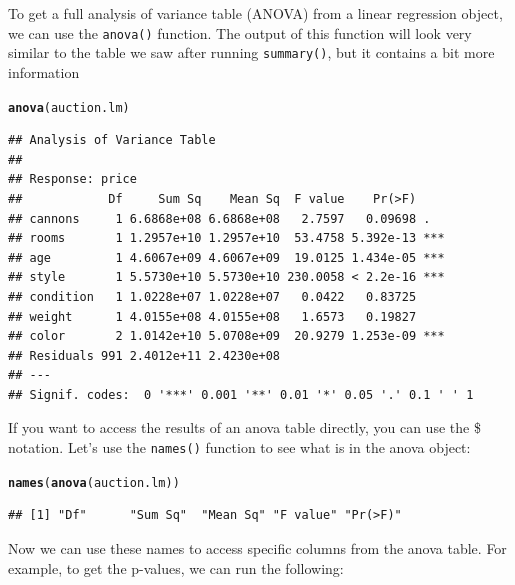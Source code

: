 \documentclass{tufte-book}\usepackage[]{graphicx}\usepackage[]{color}
\makeatletter
\newcommand{\hlstd}[1]{\textcolor[rgb]{0.345,0.345,0.345}{#1}}%
\newcommand{\hlkwd}[1]{\textcolor[rgb]{0.737,0.353,0.396}{\textbf{#1}}}%
\newenvironment{kframe}{%
 \def\at@end@of@kframe{}%
 \ifinner\ifhmode%
  \def\at@end@of@kframe{\end{minipage}}%
  \begin{minipage}{\columnwidth}%
 \fi\fi%
 \def\FrameCommand##1{\hskip\@totalleftmargin \hskip-\fboxsep
 \colorbox{shadecolor}{##1}\hskip-\fboxsep
     \hskip-\linewidth \hskip-\@totalleftmargin \hskip\columnwidth}%
 \MakeFramed {\advance\hsize-\width
   \@totalleftmargin\z@ \linewidth\hsize
   \@setminipage}}%
 {\par\unskip\endMakeFramed%
 \at@end@of@kframe}
\newenvironment{knitrout}{}{} %
\makeatother
\begin{document}
To get a full analysis of variance table (ANOVA) from a linear regression object, we can use the \texttt{anova()} function. The output of this function will look very similar to the table we saw after running \texttt{summary()}, but it contains a bit more information

\begin{knitrout}
\color{fgcolor}\begin{kframe}
\begin{alltt}
\hlkwd{anova}\hlstd{(auction.lm)}
\end{alltt}
\begin{verbatim}
## Analysis of Variance Table
## 
## Response: price
##            Df     Sum Sq    Mean Sq  F value    Pr(>F)    
## cannons     1 6.6868e+08 6.6868e+08   2.7597   0.09698 .  
## rooms       1 1.2957e+10 1.2957e+10  53.4758 5.392e-13 ***
## age         1 4.6067e+09 4.6067e+09  19.0125 1.434e-05 ***
## style       1 5.5730e+10 5.5730e+10 230.0058 < 2.2e-16 ***
## condition   1 1.0228e+07 1.0228e+07   0.0422   0.83725    
## weight      1 4.0155e+08 4.0155e+08   1.6573   0.19827    
## color       2 1.0142e+10 5.0708e+09  20.9279 1.253e-09 ***
## Residuals 991 2.4012e+11 2.4230e+08                       
## ---
## Signif. codes:  0 '***' 0.001 '**' 0.01 '*' 0.05 '.' 0.1 ' ' 1
\end{verbatim}
\end{kframe}
\end{knitrout}

If you want to access the results of an anova table directly, you can use the \$ notation. Let's use the \texttt{names()} function to see what is in the anova object:

\begin{footnotesize}
\begin{knitrout}
\color{fgcolor}\begin{kframe}
\begin{alltt}
\hlkwd{names}\hlstd{(}\hlkwd{anova}\hlstd{(auction.lm))}
\end{alltt}
\begin{verbatim}
## [1] "Df"      "Sum Sq"  "Mean Sq" "F value" "Pr(>F)"
\end{verbatim}
\end{kframe}
\end{knitrout}
\end{footnotesize}


Now we can use these names to access specific columns from the anova table. For example, to get the p-values, we can run the following:
\end{document}
